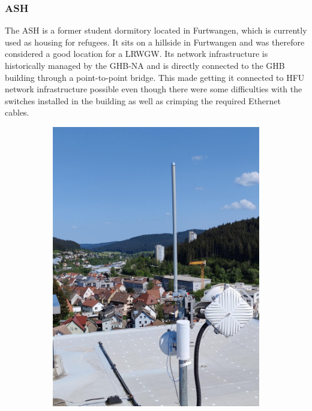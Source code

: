 \subsubsection{\acl{ASH}}

The \ac{ASH} is a former student dormitory located in Furtwangen, which is currently used as housing for refugees.
It sits on a hillside in Furtwangen and was therefore considered a good location for a \acl{LRWGW}.
Its network infrastructure is historically managed by the \acl{GHB-NA} and is directly connected to the \ac{GHB} building through a point-to-point bridge.
This made getting it connected to \ac{HFU} network infrastructure possible even though there were some difficulties with the switches installed in the building as well as crimping the required Ethernet cables.


\begin{figure}
    \centering
    \begin{subfigure}[t]{0.5\textwidth}
        \centering
        \includegraphics[width=1\textwidth]{pictures/hardware/gateway-deployment/gateway_ash.jpg}

\end{subfigure}
\end{figure}

